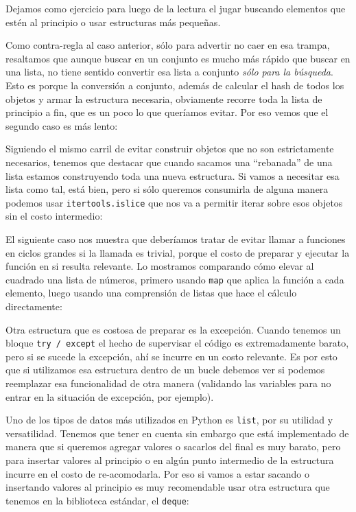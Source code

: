 Dejamos como ejercicio para luego de la lectura el jugar buscando elementos que estén al principio o usar estructuras más pequeñas.

Como contra-regla al caso anterior, sólo para advertir no caer en esa trampa, resaltamos que aunque buscar en un conjunto es mucho más rápido que buscar en una lista, no tiene sentido convertir esa lista a conjunto \textit{sólo para la búsqueda}. Esto es porque la conversión a conjunto, además de calcular el hash de todos los objetos y armar la estructura necesaria, obviamente recorre toda la lista de principio a fin, que es un poco lo que queríamos evitar. Por eso vemos que el segundo caso es más lento:


Siguiendo el mismo carril de evitar construir objetos que no son estrictamente necesarios, tenemos que destacar que cuando sacamos una ``rebanada'' de una lista estamos construyendo toda una nueva estructura. Si vamos a necesitar esa lista como tal, está bien, pero si sólo queremos consumirla de alguna manera podemos usar \texttt{itertools.islice} que nos va a permitir iterar sobre esos objetos sin el costo intermedio:


El siguiente caso nos muestra que deberíamos tratar de evitar llamar a funciones en ciclos grandes si la llamada es trivial, porque el costo de preparar y ejecutar la función en si resulta relevante. Lo mostramos comparando cómo elevar al cuadrado una lista de números, primero usando \texttt{map} que aplica la función a cada elemento, luego usando una comprensión de listas que hace el cálculo directamente:


Otra estructura que es costosa de preparar es la excepción. Cuando tenemos un bloque \texttt{try / except} el hecho de supervisar el código es extremadamente barato, pero si se sucede la excepción, ahí se incurre en un costo relevante. Es por esto que si utilizamos esa estructura dentro de un bucle debemos ver si podemos reemplazar esa funcionalidad de otra manera (validando las variables para no entrar en la situación de excepción, por ejemplo).


Uno de los tipos de datos más utilizados en Python es \texttt{list}, por su utilidad y versatilidad. Tenemos que tener en cuenta sin embargo que está implementado de manera que si queremos agregar valores o sacarlos del final es muy barato, pero para insertar valores al principio o en algún punto intermedio de la estructura incurre en el costo de re-acomodarla. Por eso si vamos a estar sacando o insertando valores al principio es muy recomendable usar otra estructura que tenemos en la biblioteca estándar, el \texttt{deque}:

